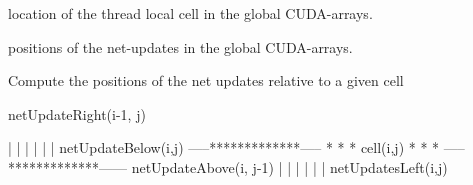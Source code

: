 location of the thread local cell in the global C\-U\-D\-A-\/arrays.

positions of the net-\/updates in the global C\-U\-D\-A-\/arrays.

Compute the positions of the net updates relative to a given cell


\begin{DoxyPre}
                 netUpdateRight(i-1, j)\end{DoxyPre}



\begin{DoxyPre}                          |           |
                          |           |
                          |           |
 netUpdateBelow(i,j) -----*************-----
                          *           *
                          * cell(i,j) *
                          *           *
                     -----*************------ netUpdateAbove(i, j-1)
                          |           |
                          |           |
                          |           |
                               netUpdatesLeft(i,j)
\end{DoxyPre}
